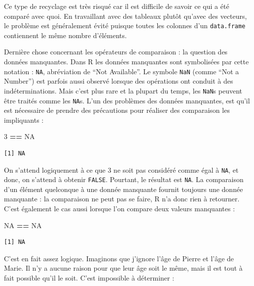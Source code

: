 \documentclass[a4paperpaper,]{article}
\newenvironment{Shaded}{\begin{snugshade}}{\end{snugshade}}
\newcommand{\DecValTok}[1]{\textcolor[rgb]{0.00,0.00,0.81}{#1}}
\newcommand{\StringTok}[1]{\textcolor[rgb]{0.31,0.60,0.02}{#1}}
\newcommand{\OtherTok}[1]{\textcolor[rgb]{0.56,0.35,0.01}{#1}}
\newcommand{\OperatorTok}[1]{\textcolor[rgb]{0.81,0.36,0.00}{\textbf{#1}}}
\theoremstyle{definition}
\theoremstyle{definition}
\theoremstyle{definition}
\theoremstyle{remark}
\begin{document}
Ce type de recyclage est très risqué car il est difficile de savoir ce
qui a été comparé avec quoi. En travaillant avec des tableaux plutôt
qu'avec des vecteurs, le problème est généralement évité puisque toutes
les colonnes d'un \texttt{data.frame} contiennent le même nombre
d'éléments.

Dernière chose concernant les opérateurs de comparaison : la question
des données manquantes. Dans R les données manquantes sont symbolisées
par cette notation : \texttt{NA}, abréviation de ``Not Available''. Le
symbole \texttt{NaN} (comme ``Not a Number'') est parfois aussi observé
lorsque des opérations ont conduit à des indéterminations. Mais c'est
plus rare et la plupart du temps, les \texttt{NaN}s peuvent être traités
comme les \texttt{NA}s. L'un des problèmes des données manquantes, est
qu'il est nécessaire de prendre des précautions pour réaliser des
comparaison les impliquants :

\begin{Shaded}
\begin{Highlighting}[]
\DecValTok{3} \OperatorTok{==}\StringTok{ }\OtherTok{NA}
\end{Highlighting}
\end{Shaded}

\begin{verbatim}
[1] NA
\end{verbatim}

On s'attend logiquement à ce que 3 ne soit pas considéré comme égal à
\texttt{NA}, et donc, on s'attend à obtenir \texttt{FALSE}. Pourtant, le
résultat est \texttt{NA}. La comparaison d'un élément quelconque à une
donnée manquante fournit toujours une donnée manquante : la comparaison
ne peut pas se faire, R n'a donc rien à retourner. C'est également le
cas aussi lorsque l'on compare deux valeurs manquantes :

\begin{Shaded}
\begin{Highlighting}[]
\OtherTok{NA} \OperatorTok{==}\StringTok{ }\OtherTok{NA}
\end{Highlighting}
\end{Shaded}

\begin{verbatim}
[1] NA
\end{verbatim}

C'est en fait assez logique. Imaginons que j'ignore l'âge de Pierre et
l'âge de Marie. Il n'y a aucune raison pour que leur âge soit le même,
mais il est tout à fait possible qu'il le soit. C'est impossible à
déterminer :
\end{document}
